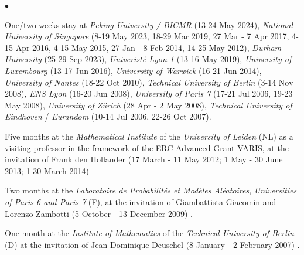 \documentclass[a4paper,11pt,oneside]{amsart}
\newenvironment{myitemize}{%
\begin{list}{$\bullet$}%
 	{%
	\setlength{\itemsep}{0.3em}%
	\setlength{\topsep}{0.3em}%
	\setlength{\partopsep}{0em}%
	\setlength{\parsep}{0em}%
	\setlength{\parskip}{0em}%
	\setlength\leftmargin{1.5em}%
	\setlength\labelwidth{1.1em}%
	\setlength{\labelsep}{0.4em}%
	}%
	}%
{\end{list}}
\renewenvironment{itemize}{
\begin{myitemize}}%
{\end{myitemize}}
\begin{document}
\begin{itemize}
\item One/two weeks stay at 
\emph{Peking University / BICMR} (13-24 May 2024),
\emph{National University of Singapore} 
(8-19 May 2023, 18-29 Mar 2019, 27 Mar - 7 Apr 2017, 4-15 Apr 2016, 4-15 May 2015,
27 Jan - 8 Feb 2014, 14-25 May 2012), 
\emph{Durham University} (25-29 Sep 2023),
\emph{Univerist\'e Lyon 1} (13-16 May 2019),
\emph{University of Luxembourg} (13-17 Jun 2016),
\emph{University of Warwick} (16-21 Jun 2014),
\emph{University of Nantes} (18-22 Oct 2010),
\emph{Technical University of Berlin} (3-14 Nov 2008), \emph{ENS Lyon} (16-20 Jun 2008),
\textit{University of Paris 7} (17-21 Jul 2006, 19-23 May 2008),
\textit{University of Z\"urich} (28 Apr - 2 May 2008),
\emph{Technical University of Eindhoven} / \emph{Eurandom}
 (10-14 Jul 2006, 22-26 Oct 2007).

\item Five months at the \emph{Mathematical Institute} of the \emph{University of Leiden} (NL)
as a visiting professor in the framework of the
ERC Advanced Grant VARIS, at the invitation of Frank den Hollander
(17 March - 11 May 2012; 1 May - 30 June 2013; 1-30 March 2014) 

\item Two months at the
\textit{Laboratoire de Probabilit\'es et Mod\`eles Al\'eatoires},
\textit{Universities of Paris 6 and Paris 7} (F), at the invitation of Giambattista Giacomin
and Lorenzo Zambotti  (5 October - 13 December 2009) .

\item One month at the \emph{Institute of Mathematics} of the
\emph{Technical University of Berlin} (D)
at the invitation of Jean-Dominique Deuschel (8 January - 2 February 2007) .


\end{itemize}
\end{document}
